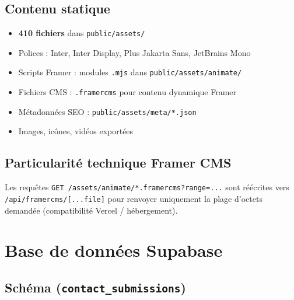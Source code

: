 \documentclass[11pt,a4paper]{report}
\begin{document}
\section{Contenu statique}

\begin{itemize}[leftmargin=*]
  \item \textbf{410 fichiers} dans \texttt{public/assets/}
  \item Polices : Inter, Inter Display, Plus Jakarta Sans, JetBrains Mono
  \item Scripts Framer : modules \texttt{.mjs} dans \texttt{public/assets/animate/}
  \item Fichiers CMS : \texttt{.framercms} pour contenu dynamique Framer
  \item Métadonnées SEO : \texttt{public/assets/meta/*.json}
  \item Images, icônes, vidéos exportées
\end{itemize}

\section{Particularité technique Framer CMS}

Les requêtes \texttt{GET /assets/animate/*.framercms?range=...} sont réécrites vers \texttt{/api/framercms/[...file]} pour renvoyer uniquement la plage d'octets demandée (compatibilité Vercel / hébergement).

\chapter{Base de données Supabase}

\section{Schéma (\texttt{contact\_submissions})}
\end{document}
